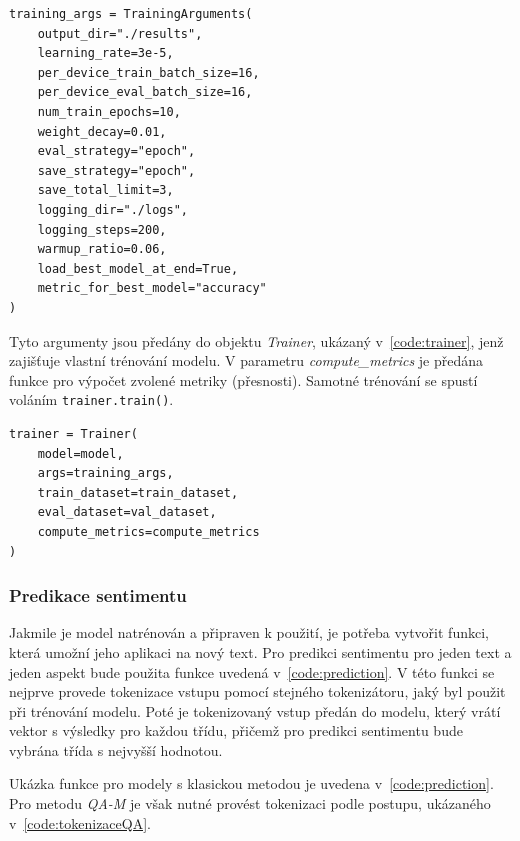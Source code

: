 \begin{listing}[ht]
\centering
\begin{verbatim}
training_args = TrainingArguments(
    output_dir="./results",
    learning_rate=3e-5,
    per_device_train_batch_size=16,
    per_device_eval_batch_size=16,
    num_train_epochs=10,
    weight_decay=0.01,
    eval_strategy="epoch",
    save_strategy="epoch",
    save_total_limit=3,
    logging_dir="./logs",
    logging_steps=200,
    warmup_ratio=0.06,
    load_best_model_at_end=True,
    metric_for_best_model="accuracy"
)
\end{verbatim}
\caption[Ukázka struktury TrainingArguments]%
{Ukázka struktury TrainingArguments, vlastní práce}
\label{code:trainingarguments}
\end{listing}

Tyto argumenty jsou předány do objektu \emph{Trainer}, ukázaný v~\ref{code:trainer}, jenž zajišťuje vlastní trénování modelu. V parametru \emph{compute\_metrics} je předána funkce pro výpočet zvolené metriky (přesnosti). Samotné trénování se spustí voláním \texttt{trainer.train()}.

\begin{listing}[ht]
\begin{verbatim}
trainer = Trainer(
    model=model,
    args=training_args,
    train_dataset=train_dataset,
    eval_dataset=val_dataset,
    compute_metrics=compute_metrics
)
\end{verbatim}
\caption[Ukázka struktury Trainer]%
{Ukázka struktury Trainer, vlastní práce}
\label{code:trainer}
\end{listing}

\subsubsection{Predikace sentimentu}
Jakmile je model natrénován a připraven k použití, je potřeba vytvořit funkci, která umožní jeho aplikaci na nový text. Pro predikci sentimentu pro jeden text a jeden aspekt bude použita funkce uvedená v~\ref{code:prediction}. V této funkci se nejprve provede tokenizace vstupu pomocí stejného tokenizátoru, jaký byl použit při trénování modelu. Poté je tokenizovaný vstup předán do modelu, který vrátí vektor s výsledky pro každou třídu, přičemž pro predikci sentimentu bude vybrána třída s nejvyšší hodnotou.

Ukázka funkce pro modely s klasickou metodou je uvedena v~\ref{code:prediction}. Pro metodu \emph{QA-M} je však nutné provést tokenizaci podle postupu, ukázaného v~\ref{code:tokenizaceQA}.

